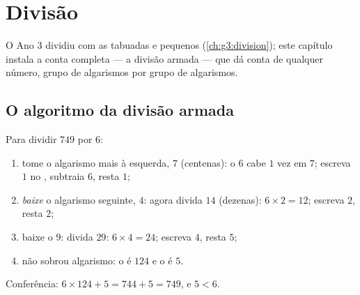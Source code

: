 \chapter{Divisão}\label{ch:g4:division}

O Ano 3 dividiu com as tabuadas e  pequenos
(\cref{ch:g3:division}); este capítulo instala a conta completa --- a
divisão armada --- que dá conta de qualquer número, grupo de
algarismos por grupo de algarismos.

\section{O algoritmo da divisão armada}

\begin{method}\label{met:g4:division:method}
Para dividir $749$ por $6$:
\begin{enumerate}
  \item tome o algarismo mais à esquerda, $7$ (centenas): o $6$ cabe
        $1$ vez em $7$; escreva $1$ no , subtraia $6$, resta
        $1$;
  \item \emph{baixe} o algarismo seguinte, $4$: agora divida $14$
        (dezenas): $6 \times 2 = 12$; escreva $2$, resta $2$;
  \item baixe o $9$: divida $29$: $6 \times 4 = 24$; escreva $4$,
        resta $5$;
  \item não sobrou algarismo: o  é $124$ e o  é $5$.
\end{enumerate}
Conferência: $6 \times 124 + 5 = 744 + 5 = 749$, e $5 < 6$.
\end{method}

